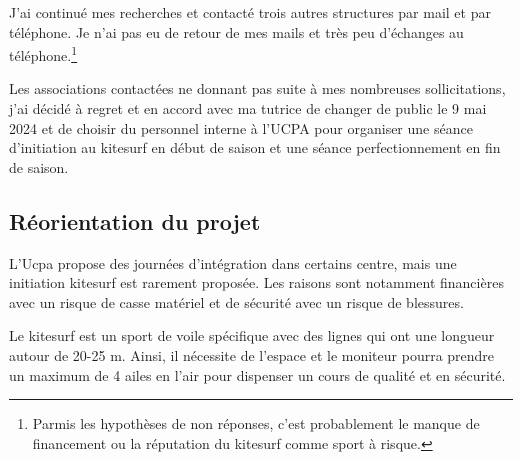 \documentclass[11pt,a4paper]{report}
\begin{document}
J'ai continué mes recherches et contacté trois autres structures
par mail et par téléphone. Je n'ai pas eu de retour de mes mails 
et très peu d'échanges au téléphone.\footnote{Parmis les hypothèses
de non réponses, c'est probablement le manque de financement ou
la réputation du kitesurf comme sport  à risque.}

Les associations contactées ne donnant pas  suite à mes nombreuses
sollicitations, j'ai décidé à regret et en accord avec ma tutrice
de changer de public le 9 mai 2024 et de choisir du personnel interne
à l'UCPA pour organiser une séance d'initiation au kitesurf en début 
de saison et une séance perfectionnement en fin de saison.

\subsection{Réorientation du projet\label{reorientation}}

L'Ucpa propose des journées d'intégration dans certains centre, mais
une initiation kitesurf est rarement proposée. Les raisons sont notamment
financières avec un risque de casse matériel et de sécurité avec un risque
de blessures.

Le kitesurf est un sport de voile spécifique avec des lignes  qui ont
une longueur autour de  20-25 m. Ainsi, il nécessite de l'espace
et le moniteur pourra prendre un maximum de 4 ailes en l'air
pour dispenser un cours de qualité et en sécurité. 
\end{document}
